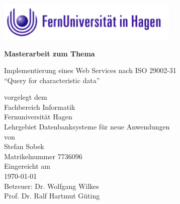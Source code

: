 \begin{titlepage}
\vspace{4em}
\begin{center}
	\includegraphics[width=0.65\textwidth]{images/feulogo.png}
\end{center}
\center

 \Large{\textsf{\textbf{Masterarbeit zum Thema}}}
 \vspace{1em}

\Huge{\textsf{Implementierung eines Web Services nach ISO 29002-31 \\  \enquote{Query for characteristic data}}}
\vspace{1em}
\\


\vspace{1em}

{\normalsize 
\textsf{
vorgelegt dem\\
Fachbereich Informatik\\Fernuniversität Hagen\\Lehrgebiet Datenbanksysteme für neue Anwendungen
}
}
\vspace{2em}
\\

\normalsize{
	\textsf{
	von \\
Stefan Sobek \\ 
Matrikelnummer 7736096 \\
\vspace{2em}
Eingereicht am \\  
\today
\vspace{3em}
\\
Betreuer: Dr. Wolfgang Wilkes\\
Prof. Dr. Ralf Hartmut Güting \\
}
}
\end{titlepage}
